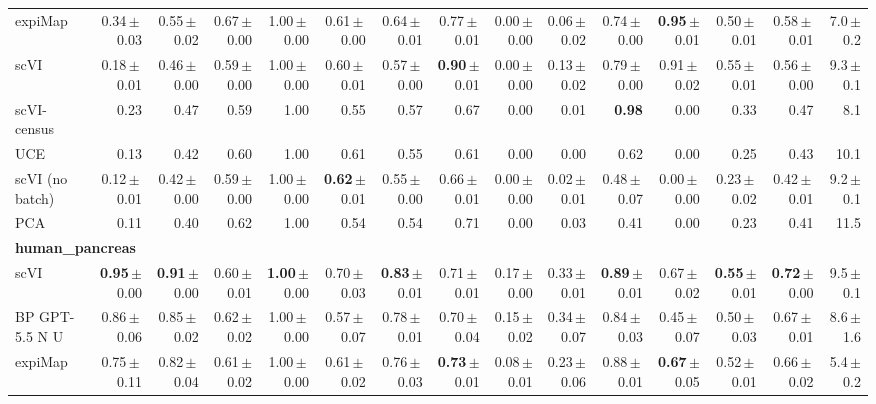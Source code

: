 \begin{table}
\begin{tabular}{lrrrrrrrrrrrrrr}
expiMap & 0.34\,$\pm$\,0.03 & 0.55\,$\pm$\,0.02 & 0.67\,$\pm$\,0.00 & 1.00\,$\pm$\,0.00 & 0.61\,$\pm$\,0.00 & 0.64\,$\pm$\,0.01 & 0.77\,$\pm$\,0.01 & 0.00\,$\pm$\,0.00 & 0.06\,$\pm$\,0.02 & 0.74\,$\pm$\,0.00 & \textbf{0.95}\,$\pm$\,0.01 & 0.50\,$\pm$\,0.01 & 0.58\,$\pm$\,0.01 & 7.0\,$\pm$\,0.2 \\
scVI & 0.18\,$\pm$\,0.01 & 0.46\,$\pm$\,0.00 & 0.59\,$\pm$\,0.00 & 1.00\,$\pm$\,0.00 & 0.60\,$\pm$\,0.01 & 0.57\,$\pm$\,0.00 & \textbf{0.90}\,$\pm$\,0.01 & 0.00\,$\pm$\,0.00 & 0.13\,$\pm$\,0.02 & 0.79\,$\pm$\,0.00 & 0.91\,$\pm$\,0.02 & 0.55\,$\pm$\,0.01 & 0.56\,$\pm$\,0.00 & 9.3\,$\pm$\,0.1 \\
scVI-census & 0.23 & 0.47 & 0.59 & 1.00 & 0.55 & 0.57 & 0.67 & 0.00 & 0.01 & \textbf{0.98} & 0.00 & 0.33 & 0.47 & 8.1 \\
UCE & 0.13 & 0.42 & 0.60 & 1.00 & 0.61 & 0.55 & 0.61 & 0.00 & 0.00 & 0.62 & 0.00 & 0.25 & 0.43 & 10.1 \\
scVI (no batch) & 0.12\,$\pm$\,0.01 & 0.42\,$\pm$\,0.00 & 0.59\,$\pm$\,0.00 & 1.00\,$\pm$\,0.00 & \textbf{0.62}\,$\pm$\,0.01 & 0.55\,$\pm$\,0.00 & 0.66\,$\pm$\,0.01 & 0.00\,$\pm$\,0.00 & 0.02\,$\pm$\,0.01 & 0.48\,$\pm$\,0.07 & 0.00\,$\pm$\,0.00 & 0.23\,$\pm$\,0.02 & 0.42\,$\pm$\,0.01 & 9.2\,$\pm$\,0.1 \\
PCA & 0.11 & 0.40 & 0.62 & 1.00 & 0.54 & 0.54 & 0.71 & 0.00 & 0.03 & 0.41 & 0.00 & 0.23 & 0.41 & 11.5 \\
\midrule
\multicolumn{15}{l}{\textbf{human\_pancreas}}\\[1pt]
scVI & \textbf{0.95}\,$\pm$\,0.00 & \textbf{0.91}\,$\pm$\,0.00 & 0.60\,$\pm$\,0.01 & \textbf{1.00}\,$\pm$\,0.00 & 0.70\,$\pm$\,0.03 & \textbf{0.83}\,$\pm$\,0.01 & 0.71\,$\pm$\,0.01 & 0.17\,$\pm$\,0.00 & 0.33\,$\pm$\,0.01 & \textbf{0.89}\,$\pm$\,0.01 & 0.67\,$\pm$\,0.02 & \textbf{0.55}\,$\pm$\,0.01 & \textbf{0.72}\,$\pm$\,0.00 & 9.5\,$\pm$\,0.1 \\
BP GPT-5.5 N U & 0.86\,$\pm$\,0.06 & 0.85\,$\pm$\,0.02 & 0.62\,$\pm$\,0.02 & 1.00\,$\pm$\,0.00 & 0.57\,$\pm$\,0.07 & 0.78\,$\pm$\,0.01 & 0.70\,$\pm$\,0.04 & 0.15\,$\pm$\,0.02 & 0.34\,$\pm$\,0.07 & 0.84\,$\pm$\,0.03 & 0.45\,$\pm$\,0.07 & 0.50\,$\pm$\,0.03 & 0.67\,$\pm$\,0.01 & 8.6\,$\pm$\,1.6 \\
expiMap & 0.75\,$\pm$\,0.11 & 0.82\,$\pm$\,0.04 & 0.61\,$\pm$\,0.02 & 1.00\,$\pm$\,0.00 & 0.61\,$\pm$\,0.02 & 0.76\,$\pm$\,0.03 & \textbf{0.73}\,$\pm$\,0.01 & 0.08\,$\pm$\,0.01 & 0.23\,$\pm$\,0.06 & 0.88\,$\pm$\,0.01 & \textbf{0.67}\,$\pm$\,0.05 & 0.52\,$\pm$\,0.01 & 0.66\,$\pm$\,0.02 & 5.4\,$\pm$\,0.2 \\

\end{tabular}
\end{table}
